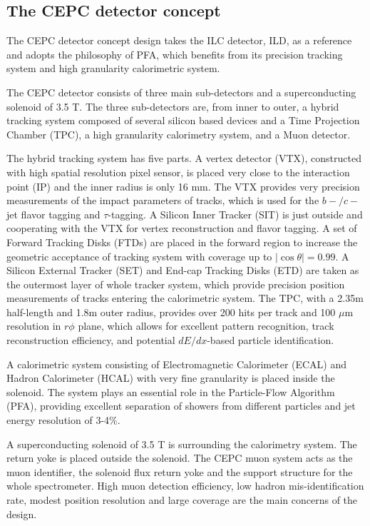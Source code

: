 \documentclass[a4paper,10pt,twoside]{cpc-hepnp}
\begin{document}
\begin{multicols}{2}
\section{The CEPC detector concept\label{sec:detector}}

The CEPC detector concept design\cite{ref:cepc_det} takes the ILC detector, ILD\cite{ref:ilc, ref:ild},
as a reference and adopts the philosophy of PFA,
which benefits from its precision tracking system and high granularity calorimetric system.

The CEPC detector consists of three main sub-detectors and a superconducting solenoid of 3.5 T.
The three sub-detectors are, from inner to outer,  a hybrid tracking system composed of several silicon based devices
and a Time Projection Chamber (TPC), a high granularity calorimetry system, and a Muon detector.

The hybrid tracking system has five parts. A vertex detector (VTX), constructed with high spatial resolution pixel sensor,
is placed very close to the interaction point (IP) and  the inner radius is only 16 mm.
The VTX provides very precision measurements of the impact parameters of tracks,
which is used for the $b-/c-$jet flavor tagging and $\tau$-tagging.
A Silicon Inner Tracker (SIT) is just outside and cooperating with the VTX for vertex reconstruction and flavor tagging.
A set of Forward Tracking Disks (FTDs) are placed in the forward region
to increase the geometric acceptance of tracking system with coverage up to $|\cos\theta| = 0.99$.
A Silicon External Tracker (SET) and End-cap Tracking Disks (ETD) are taken as the outermost layer of whole tracker system,
which provide precision position measurements of tracks entering the calorimetric system.
The TPC, with a 2.35m half-length and 1.8m outer radius, provides over 200 hits per track and 100 $\mu$m resolution in $r\phi$ plane,
which allows for excellent pattern recognition, track reconstruction efficiency, and potential $dE/dx$-based particle identification.

A calorimetric system consisting of Electromagnetic Calorimeter (ECAL) and Hadron Calorimeter (HCAL)
with very fine granularity is placed inside the solenoid.
The system plays an essential role in the Particle-Flow Algorithm (PFA),
providing excellent separation of showers from different particles and jet energy resolution of 3-4\%.

A superconducting solenoid of 3.5 T is surrounding the calorimetry system.
The return yoke is placed outside the solenoid. The CEPC muon system acts as the muon identifier,
the solenoid flux return yoke and the support structure for the whole spectrometer.
High muon detection efficiency, low hadron mis-identification rate,
modest position resolution and large coverage are the main concerns of the design.


\end{multicols}
\end{document}
